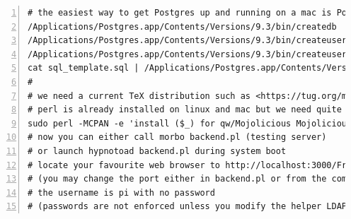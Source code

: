 \documentclass[11pt,oneside]{scrbook}
\begin{document}
\begin{appendix}
\begin{lstlisting}[caption=Installationsbefehle beispielhaft fuer MacOS X.,  label= lst:form, basicstyle={\small\ttfamily}, numbers=left]
# the easiest way to get Postgres up and running on a mac is Postgres.app
/Applications/Postgres.app/Contents/Versions/9.3/bin/createdb  aug_clinical
/Applications/Postgres.app/Contents/Versions/9.3/bin/createuser postgres -s
/Applications/Postgres.app/Contents/Versions/9.3/bin/createuser root -s
cat sql_template.sql | /Applications/Postgres.app/Contents/Versions/9.3/bin/psql aug_clinical
#
# we need a current TeX distribution such as <https://tug.org/mactex/>
# perl is already installed on linux and mac but we need quite a bunch of non-core perl modules
sudo perl -MCPAN -e 'install ($_) for qw/Mojolicious Mojolicious::Plugin::Database Mojolicious::Plugin::RenderFile SQL::Abstract::More Apache::Session::File Spreadsheet::WriteExcel Spreadsheet::ParseExcel Business::IBAN DBD::Pg Date::ICal Data::ICal Data::ICal::Entry::TimeZone/'
# now you can either call morbo backend.pl (testing server)
# or launch hypnotoad backend.pl during system boot
# locate your favourite web browser to http://localhost:3000/Frontend/index.html
# (you may change the port either in backend.pl or from the command line)
# the username is pi with no password
# (passwords are not enforced unless you modify the helper LDAPChallenge with backend.pl appropriately)
\end{lstlisting}

\end{appendix}
\end{document}
